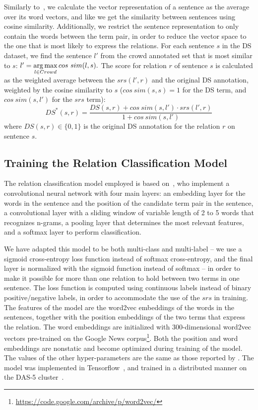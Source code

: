  Similarly to~\citet{sultan2015dls}, we calculate the vector representation of a sentence as the average over its word vectors, and like \citet{sterckx2016knowledge} we get the similarity between sentences using cosine similarity. Additionally, we restrict the sentence representation to only contain the words between the term pair, in order to reduce the vector space to the one that is most likely to express the relations. For each sentence $s$ in the DS dataset, we find the sentence $l'$ from the crowd annotated set that is most similar to $s$: $ l' = \operatorname*{arg\,max}\limits_{l \in Crowd} cos\ sim(l, s). $ The score for relation $r$ of sentence $s$ is calculated as the weighted average between the $srs(l', r)$ and the original DS annotation, weighted by the cosine similarity to $s$ ($ cos\ sim(s,s) = 1$ for the DS term, and $ cos\ sim(s, l')$ for the $srs$ term):
\begin{equation} \label{eq:ds_w2v}
DS^{*}(s, r) =  \dfrac{DS(s, r) +  cos\ sim(s, l') \cdot srs(l', r)}{1 +  cos\ sim(s, l')}
\end{equation}
\noindent where $DS(s, r) \in \{0,1\}$ is the original DS annotation for the relation $r$ on sentence $s$.


\subsection{Training the Relation Classification Model}
\label{sec:train}

The relation classification model employed is based on~\citet{nguyen2015relation}, who implement a convolutional neural network with four main layers: an embedding layer for the words in the sentence and the position of the candidate term pair in the sentence, a convolutional layer with a sliding window of variable length of 2 to 5 words that recognizes n-grams, a pooling layer that determines the most relevant features, and a softmax layer to perform classification.

We have adapted this model to be both multi-class and multi-label -- we use a sigmoid cross-entropy loss function instead of softmax cross-entropy, and the final layer is normalized with the sigmoid function instead of softmax -- in order to make it possible for more than one relation to hold between two terms in one sentence. The loss function is computed using continuous labels instead of binary positive/negative labels, in order to accommodate the use of the $srs$ in training. The features of the model are the word2vec embeddings of the words in the sentences, together with the position embeddings of the two terms that express the relation. The word embeddings are initialized with 300-dimensional word2vec vectors pre-trained on the Google News corpus\footnote{\url{https://code.google.com/archive/p/word2vec/}}. Both the position and word embeddings are nonstatic and become optimized during training of the model. The values of the other hyper-parameters are the same as those reported by \citet{nguyen2015relation}. The model was implemented in Tensorflow~\cite{abadi2016tensorflow}, and trained in a distributed manner on the DAS-5 cluster~\cite{bal2016medium}.


